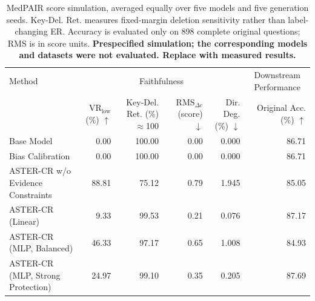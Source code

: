 \begin{table}[t]
\centering
\small
\setlength{\tabcolsep}{3pt}
\begin{tabularx}{\textwidth}{@{}>{\raggedright\arraybackslash}Xrrrrr@{}}
\toprule
Method & \multicolumn{4}{c}{Faithfulness} & \multicolumn{1}{c}{Downstream Performance} \\
\cmidrule(lr){2-5}\cmidrule(lr){6-6}
 & \shortstack{$\mathrm{VR}_{\mathrm{low}}$\\ (\%) $\uparrow$} & \shortstack{Key-Del. Ret.\\ (\%) $\approx$100} & \shortstack{$\mathrm{RMS}_{\Delta c}$\\ (score) $\downarrow$} & \shortstack{Dir. Deg.\\ (\%) $\downarrow$} & \shortstack{Original Acc.\\ (\%) $\uparrow$} \\
\midrule
Base Model & 0.00 & 100.00 & 0.00 & 0.000 & 86.71 \\
Bias Calibration & 0.00 & 100.00 & 0.00 & 0.000 & 86.71 \\
ASTER-CR w/o Evidence Constraints & 88.81 & 75.12 & 0.79 & 1.945 & 85.05 \\
ASTER-CR (Linear) & 9.33 & 99.53 & 0.21 & 0.076 & 87.17 \\
ASTER-CR (MLP, Balanced) & 46.33 & 97.17 & 0.65 & 1.008 & 84.93 \\
ASTER-CR (MLP, Strong Protection) & 24.97 & 99.10 & 0.35 & 0.205 & 87.69 \\
\bottomrule
\end{tabularx}
\caption{MedPAIR score simulation, averaged equally over five models and five generation seeds. Key-Del. Ret. measures fixed-margin deletion sensitivity rather than label-changing ER. Accuracy is evaluated only on 898 complete original questions; RMS is in score units. \textbf{Prespecified simulation; the corresponding models and datasets were not evaluated. Replace with measured results.}}
\label{tab:aster-main-14}
\end{table}

